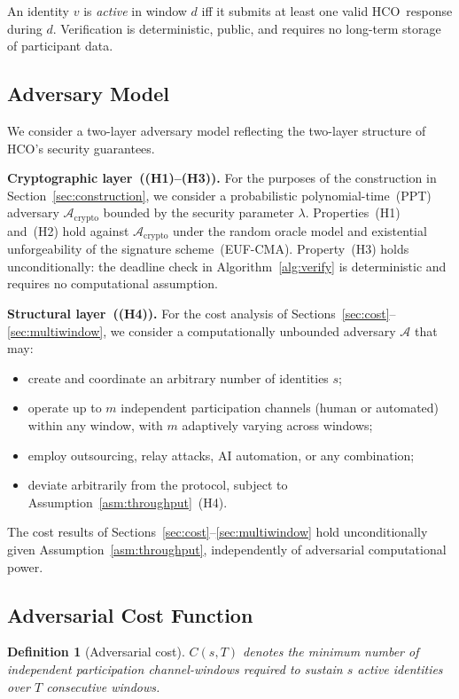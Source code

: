\documentclass[11pt]{article}
\newcommand{\HCO}{HCO\xspace}
\newtheorem{definition}{Definition}
\theoremstyle{remark}
\theoremstyle{plain}
\begin{document}
	An identity $v$ is \emph{active} in window $d$ iff it submits at least
	one valid \HCO\ response during $d$. Verification is deterministic,
	public, and requires no long-term storage of participant data.
	
	\subsection{Adversary Model}
	
	We consider a two-layer adversary model reflecting the two-layer
	structure of \HCO's security guarantees.
	
	\noindent\textbf{Cryptographic layer~((H1)--(H3)).}
	For the purposes of the construction in Section~\ref{sec:construction},
	we consider a probabilistic polynomial-time~(PPT) adversary
	$\mathcal{A}_{\mathrm{crypto}}$ bounded by the security parameter
	$\lambda$. Properties~(H1) and~(H2) hold against
	$\mathcal{A}_{\mathrm{crypto}}$ under the random oracle model and
	existential unforgeability of the signature scheme~(EUF-CMA).
	Property~(H3) holds unconditionally: the deadline check in
	Algorithm~\ref{alg:verify} is deterministic and requires no
	computational assumption.
	
	\noindent\textbf{Structural layer~((H4)).}
	For the cost analysis of
	Sections~\ref{sec:cost}--\ref{sec:multiwindow}, we consider a
	computationally unbounded adversary $\mathcal{A}$ that may:
	\begin{itemize}
		\item create and coordinate an arbitrary number of identities $s$;
		\item operate up to $m$ independent participation channels (human or
		automated) within any window, with $m$ adaptively varying across windows;
		\item employ outsourcing, relay attacks, AI automation, or any combination;
		\item deviate arbitrarily from the protocol, subject to
		Assumption~\ref{asm:throughput}~(H4).
	\end{itemize}
	The cost results of Sections~\ref{sec:cost}--\ref{sec:multiwindow}
	hold unconditionally given Assumption~\ref{asm:throughput},
	independently of adversarial computational power.
	
	\subsection{Adversarial Cost Function}
	
	\begin{definition}[Adversarial cost]
		$C(s, T)$ denotes the minimum number of independent participation
		channel-windows required to sustain $s$ active identities over $T$
		consecutive windows.
	\end{definition}
	
\end{document}
